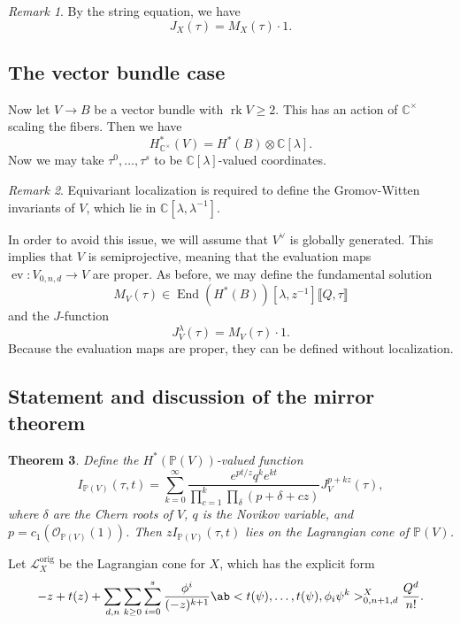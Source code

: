 \documentclass[leqno, openany]{memoir}
\newtheorem{thm}{Theorem}[section]
\theoremstyle{definition}
\theoremstyle{remark}
\newtheorem{rmk}[thm]{Remark}
\theoremstyle{plain}
\theoremstyle{definition}
\theoremstyle{remark}
\newcommand{\C}{\mathbb{C}}
\renewcommand{\P}{\mathbb{P}}
\newcommand{\mc}[1]{\mathcal{#1}}
\newcommand{\mr}[1]{\mathrm{#1}}
\newcommand{\on}[1]{\operatorname{#1}}
\DeclareMathOperator{\End}{End}
\begin{document}
\begin{rmk}
    By the string equation, we have
    \[ J_X(\tau) = M_X(\tau) \cdot 1. \]
\end{rmk}

\subsection{The vector bundle case}%
\label{sub:The vector bundle case}


Now let $V \to B$ be a vector bundle with $\on{rk} V \geq 2$. This has an action of $\C^{\times}$ scaling the fibers. Then we have
\[ H_{\C^{\times}}^*(V) = H^*(B) \otimes \C[\lambda]. \]
Now we may take $\tau^0, \ldots, \tau^s$ to be $\C[\lambda]$-valued coordinates.

\begin{rmk}
    Equivariant localization is required to define the Gromov-Witten invariants of $V$, which lie in $\C[\lambda, \lambda^{-1}]$.
\end{rmk}

In order to avoid this issue, we will assume that $V^{\vee}$ is globally generated. This implies that $V$ is semiprojective, meaning that the evaluation maps $\on{ev} \colon V_{0,n,d} \to V$ are proper. As before, we may define the fundamental solution
\[ M_V(\tau) \in \End(H^*(B))[\lambda, z^{-1}] \llbracket Q, \tau \rrbracket \]
and the $J$-function
\[ J_V^{\lambda}(\tau) = M_V(\tau) \cdot 1. \]
Because the evaluation maps are proper, they can be defined without localization.

\subsection{Statement and discussion of the mirror theorem}%
\label{sub:Statement and discussion of the mirror theorem}


\begin{thm}\label{thm:projbundlemirror}
    Define the $H^*(\P(V))$-valued function
    \[ I_{\P(V)}(\tau, t) = \sum_{k=0}^{\infty} \frac{e^{pt/z} q^k e^{kt}}{\prod_{c=1}^k \prod_{\delta} (p+\delta  + cz)} J_V^{p+kz}(\tau), \]
    where $\delta$ are the Chern roots of $V$, $q$ is the Novikov variable, and $p = c_1(\mc{O}_{\P(V)}(1))$. Then $z I_{\P(V)}(\tau, t)$ lies on the Lagrangian cone of $\P(V)$.
\end{thm}

Let $\mc{L}_X^{\mr{orig}}$ be the Lagrangian cone for $X$, which has the explicit form
\begin{equation}\label{eqn:lagcone}
    -z + t(z) + \sum_{d,n} \sum_{k\geq 0} \sum_{i=0}^s \frac{\phi^i}{(-z)^{k+1}} \ab<t(\psi), \ldots, t(\psi), \phi_i \psi^k>_{0,n+1,d}^X \frac{Q^d}{n!}. 
\end{equation}
\end{document}
